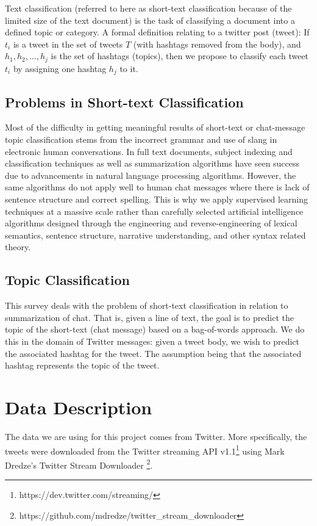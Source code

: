 \documentclass[11pt,letterpaper]{article}
\begin{document}
  Text classification (referred to here as short-text classification because of the limited size of the text document) is the task of classifying a document into a defined topic or category. A formal definition relating to a twitter post (tweet): If $t_i$ is a tweet in the set of tweets $T$ (with hashtags removed from the body), and ${h_1, h_2,...,h_j}$ is the set of hashtags (topics), then we propose to classify each tweet $t_i$ by assigning one hashtag $h_j$ to it.
  
\subsection{Problems in Short-text Classification}
  Most of the difficulty in getting meaningful results of short-text or chat-message topic classification stems from the incorrect grammar and use of slang in electronic human conversations. In full text documents, subject indexing and classification techniques as well as summarization algorithms have seen success due to advancements in natural language processing algorithms. However, the same algorithms do not apply well to human chat messages where there is lack of sentence structure and correct spelling.
  This is why we apply supervised learning techniques at a massive scale rather than carefully selected artificial intelligence algorithms designed through the engineering and reverse-engineering of lexical semantics, sentence structure, narrative understanding, and other syntax related theory.

\subsection{Topic Classification}
  This survey deals with the problem of short-text classification in relation to summarization of chat. That is, given a line of text, the goal is to predict the topic of the short-text (chat message) based on a bag-of-words approach. We do this in the domain of Twitter messages: given a tweet body, we wish to predict the associated hashtag for the tweet. The assumption being that the associated hashtag represents the topic of the tweet.
  


\section{Data Description}
The data we are using for this project comes from Twitter. More specifically, the tweets were downloaded from the Twitter streaming API v1.1\footnote{https://dev.twitter.com/streaming/} using Mark Dredze's Twitter Stream Downloader \footnote{https://github.com/mdredze/twitter\_stream\_downloader}.
 
\end{document}

